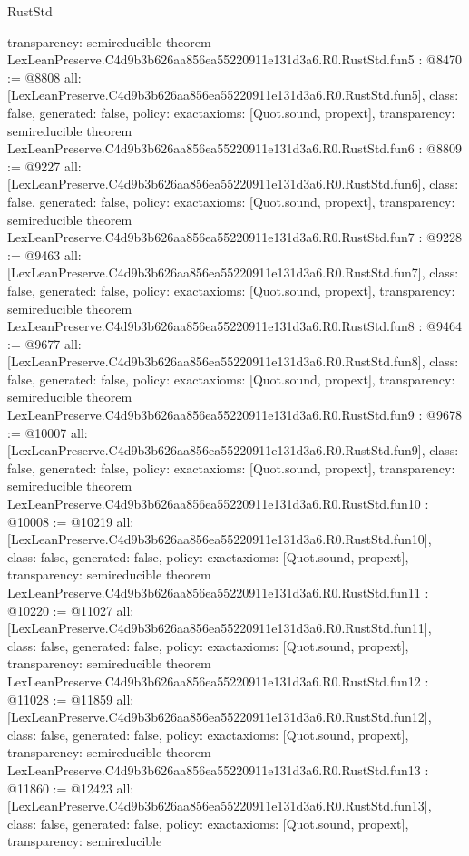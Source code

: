 \begin{lexlean}{RustStd}
\begin{coremodule}
{  transparency: semireducible
}
theorem LexLeanPreserve.C4d9b3b626aa856ea55220911e131d3a6.R0.RustStd.fun5 : @8470 := @8808 {
  all: [LexLeanPreserve.C4d9b3b626aa856ea55220911e131d3a6.R0.RustStd.fun5],
  class: false,
  generated: false,
  policy: exact{axioms: [Quot.sound, propext]},
  transparency: semireducible
}
theorem LexLeanPreserve.C4d9b3b626aa856ea55220911e131d3a6.R0.RustStd.fun6 : @8809 := @9227 {
  all: [LexLeanPreserve.C4d9b3b626aa856ea55220911e131d3a6.R0.RustStd.fun6],
  class: false,
  generated: false,
  policy: exact{axioms: [Quot.sound, propext]},
  transparency: semireducible
}
theorem LexLeanPreserve.C4d9b3b626aa856ea55220911e131d3a6.R0.RustStd.fun7 : @9228 := @9463 {
  all: [LexLeanPreserve.C4d9b3b626aa856ea55220911e131d3a6.R0.RustStd.fun7],
  class: false,
  generated: false,
  policy: exact{axioms: [Quot.sound, propext]},
  transparency: semireducible
}
theorem LexLeanPreserve.C4d9b3b626aa856ea55220911e131d3a6.R0.RustStd.fun8 : @9464 := @9677 {
  all: [LexLeanPreserve.C4d9b3b626aa856ea55220911e131d3a6.R0.RustStd.fun8],
  class: false,
  generated: false,
  policy: exact{axioms: [Quot.sound, propext]},
  transparency: semireducible
}
theorem LexLeanPreserve.C4d9b3b626aa856ea55220911e131d3a6.R0.RustStd.fun9 : @9678 := @10007 {
  all: [LexLeanPreserve.C4d9b3b626aa856ea55220911e131d3a6.R0.RustStd.fun9],
  class: false,
  generated: false,
  policy: exact{axioms: [Quot.sound, propext]},
  transparency: semireducible
}
theorem LexLeanPreserve.C4d9b3b626aa856ea55220911e131d3a6.R0.RustStd.fun10 : @10008 := @10219 {
  all: [LexLeanPreserve.C4d9b3b626aa856ea55220911e131d3a6.R0.RustStd.fun10],
  class: false,
  generated: false,
  policy: exact{axioms: [Quot.sound, propext]},
  transparency: semireducible
}
theorem LexLeanPreserve.C4d9b3b626aa856ea55220911e131d3a6.R0.RustStd.fun11 : @10220 := @11027 {
  all: [LexLeanPreserve.C4d9b3b626aa856ea55220911e131d3a6.R0.RustStd.fun11],
  class: false,
  generated: false,
  policy: exact{axioms: [Quot.sound, propext]},
  transparency: semireducible
}
theorem LexLeanPreserve.C4d9b3b626aa856ea55220911e131d3a6.R0.RustStd.fun12 : @11028 := @11859 {
  all: [LexLeanPreserve.C4d9b3b626aa856ea55220911e131d3a6.R0.RustStd.fun12],
  class: false,
  generated: false,
  policy: exact{axioms: [Quot.sound, propext]},
  transparency: semireducible
}
theorem LexLeanPreserve.C4d9b3b626aa856ea55220911e131d3a6.R0.RustStd.fun13 : @11860 := @12423 {
  all: [LexLeanPreserve.C4d9b3b626aa856ea55220911e131d3a6.R0.RustStd.fun13],
  class: false,
  generated: false,
  policy: exact{axioms: [Quot.sound, propext]},
  transparency: semireducible
}
\end{coremodule}
\end{lexlean}
